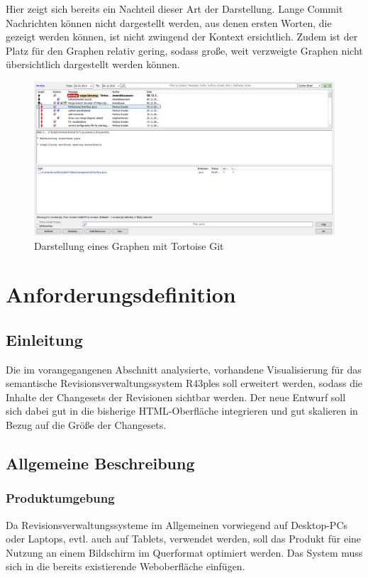\documentclass[nocolor]{tudbook}
\begin{document}
Hier zeigt sich bereits ein Nachteil dieser Art der Darstellung. Lange Commit Nachrichten können nicht dargestellt werden, aus denen ersten Worten, die gezeigt werden können, ist nicht zwingend der Kontext ersichtlich. Zudem ist der Platz für den Graphen relativ gering, sodass große, weit verzweigte Graphen nicht übersichtlich dargestellt werden können.

\begin{figure}[htb]
	\centering
	\includegraphics[width=\textwidth]{TortoiseGit.png}
	\caption{Darstellung eines Graphen mit Tortoise Git}
	\label{fig:TortoiseGit}
\end{figure}

\chapter{Anforderungsdefinition}
\section{Einleitung}
Die im vorangegangenen Abschnitt analysierte, vorhandene Visualisierung für das semantische Revisionsverwaltungssystem R43ples soll erweitert werden, sodass die Inhalte der Changesets der Revisionen sichtbar werden. Der neue Entwurf soll sich dabei gut in die bisherige HTML-Oberfläche integrieren und gut skalieren in Bezug auf die Größe der Changesets.

\section{Allgemeine Beschreibung}
\subsection{Produktumgebung}
Da Revisionsverwaltungssysteme im Allgemeinen vorwiegend auf Desktop-PCs oder Laptops, evtl. auch auf Tablets, verwendet werden, soll das Produkt für eine Nutzung an einem Bildschirm im Querformat optimiert werden. Das System muss sich in die bereits existierende Weboberfläche einfügen.
\end{document}
